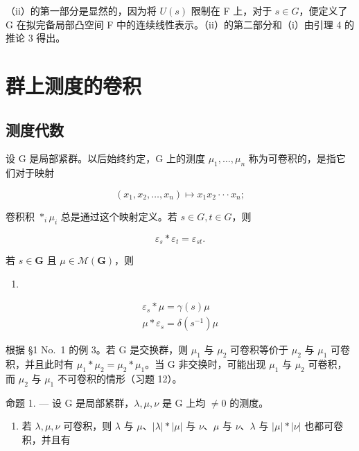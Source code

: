 （ii）的第一部分是显然的，因为将 \(U(s)\) 限制在 F 上，对于 \(s \in G\)，便定义了 G 在拟完备局部凸空间 F 中的连续线性表示。（ii）的第二部分和（i）由引理 4 的推论 3 得出。

\section{群上测度的卷积}

\subsection{测度代数}

设 G 是局部紧群。以后始终约定，G 上的测度 \(\mu_{1},\ldots,\mu_{n}\) 称为可卷积的，是指它们对于映射

\[
(x _ {1}, x _ {2}, \ldots , x _ {n}) \mapsto x _ {1} x _ {2} \cdot \cdot \cdot x _ {n};
\]

卷积积 \(\ast_{i}\mu_{i}\) 总是通过这个映射定义。若 \(s\in G, t\in G\)，则

\[
\varepsilon_ {s} * \varepsilon_ {t} = \varepsilon_ {s t}.\tag{1}
\]

若 \(s \in \mathbf{G}\) 且 \(\mu \in \mathcal{M}(\mathbf{G})\)，则

\begin{enumerate}
\def\labelenumi{(\arabic{enumi})}
\setcounter{enumi}{1}
\tightlist
\item
\end{enumerate}

\[
\begin{array}{l} \varepsilon_ {s} * \mu = \gamma (s) \mu \\ \mu * \varepsilon_ {s} = \delta (s ^ {- 1}) \mu \end{array}\tag{3}
\]

根据 §1 No.~1 的例 3。若 G 是交换群，则 \(\mu_{1}\) 与 \(\mu_{2}\) 可卷积等价于 \(\mu_{2}\) 与 \(\mu_{1}\) 可卷积，并且此时有 \(\mu_{1} * \mu_{2} = \mu_{2} * \mu_{1}\)。当 G 非交换时，可能出现 \(\mu_{1}\) 与 \(\mu_{2}\) 可卷积，而 \(\mu_{2}\) 与 \(\mu_{1}\) 不可卷积的情形（习题 12）。

命题 1. --- 设 G 是局部紧群，\(\lambda, \mu, \nu\) 是 G 上均 \(\neq 0\) 的测度。

\begin{enumerate}
\def\labelenumi{(\roman{enumi})}
\tightlist
\item
  若 \(\lambda, \mu, \nu\) 可卷积，则 \(\lambda\) 与 \(\mu\)、\(|\lambda| * |\mu|\) 与 \(\nu\)、\(\mu\) 与 \(\nu\)、\(\lambda\) 与 \(|\mu| * |\nu|\) 也都可卷积，并且有
\end{enumerate}

